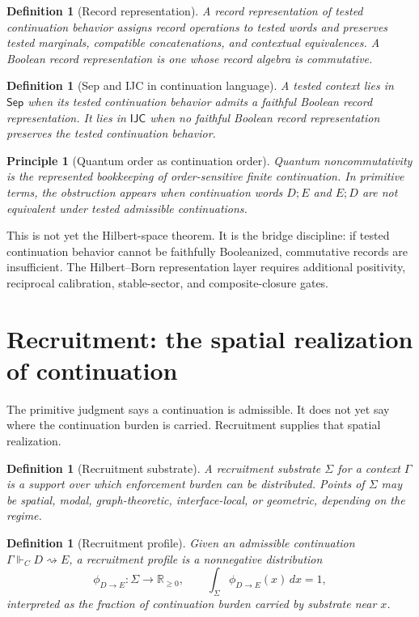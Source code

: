 \documentclass[11pt]{article}
\newtheorem{definition}[theorem]{Definition}
\newtheorem{principle}[theorem]{Principle}
\theoremstyle{remark}
\newcommand{\G}{\Gamma}
\newcommand{\entails}{\Vdash}
\newcommand{\goes}{\rightsquigarrow}
\newcommand{\Sep}{\mathsf{Sep}}
\newcommand{\IJC}{\mathsf{IJC}}
\newcommand{\R}{\mathbb R}
\begin{document}
\begin{definition}[Record representation]
A record representation of tested continuation behavior assigns record operations to tested words and preserves tested marginals, compatible concatenations, and contextual equivalences.  A Boolean record representation is one whose record algebra is commutative.
\end{definition}

\begin{definition}[Sep and IJC in continuation language]
A tested context lies in \(\Sep\) when its tested continuation behavior admits a faithful Boolean record representation.  It lies in \(\IJC\) when no faithful Boolean record representation preserves the tested continuation behavior.
\end{definition}

\begin{principle}[Quantum order as continuation order]
Quantum noncommutativity is the represented bookkeeping of order-sensitive finite continuation.  In primitive terms, the obstruction appears when continuation words \(D;E\) and \(E;D\) are not equivalent under tested admissible continuations.
\end{principle}

This is not yet the Hilbert-space theorem.  It is the bridge discipline: if tested continuation behavior cannot be faithfully Booleanized, commutative records are insufficient.  The Hilbert--Born representation layer requires additional positivity, reciprocal calibration, stable-sector, and composite-closure gates.

\section{Recruitment: the spatial realization of continuation}

The primitive judgment says a continuation is admissible.  It does not yet say where the continuation burden is carried.  Recruitment supplies that spatial realization.

\begin{definition}[Recruitment substrate]
A recruitment substrate \(\Sigma\) for a context \(\G\) is a support over which enforcement burden can be distributed.  Points of \(\Sigma\) may be spatial, modal, graph-theoretic, interface-local, or geometric, depending on the regime.
\end{definition}

\begin{definition}[Recruitment profile]
Given an admissible continuation \(\G\entails_C D\goes E\), a recruitment profile is a nonnegative distribution
\[
        \phi_{D\to E}:\Sigma\to\R_{\ge0},
        \qquad
        \int_\Sigma \phi_{D\to E}(x)\,dx=1,
\]
interpreted as the fraction of continuation burden carried by substrate near \(x\).
\end{definition}
\end{document}
